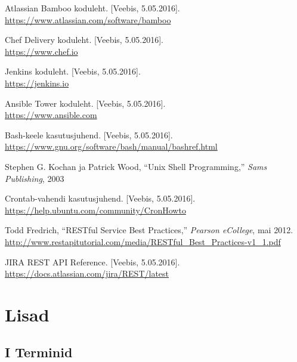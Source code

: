 \documentclass[12pt]{article}
\begin{document}
  \begin{thebibliography}{9}
    \label{kasutatud-materjalid}
    
    Atlassian Bamboo koduleht. [Veebis, 5.05.2016].\\
    \url{https://www.atlassian.com/software/bamboo}
    
    Chef Delivery koduleht. [Veebis, 5.05.2016].\\
    \url{https://www.chef.io}
  
    Jenkins koduleht. [Veebis, 5.05.2016].\\
    \url{https://jenkins.io}
  
    Ansible Tower koduleht. [Veebis, 5.05.2016].\\
    \url{https://www.ansible.com}
  
    Bash-keele kasutusjuhend. [Veebis, 5.05.2016].\\
    \url{https://www.gnu.org/software/bash/manual/bashref.html}
    
     Stephen G. Kochan ja Patrick Wood, ``Unix Shell Programming,'' \textit{Sams Publishing}, 2003
     
    Crontab-vahendi kasutusjuhend. [Veebis, 5.05.2016].\\
    \url{https://help.ubuntu.com/community/CronHowto}
    
    Todd Fredrich, ``RESTful Service Best Practices,'' \textit{Pearson eCollege}, mai 2012.\\
    \url{http://www.restapitutorial.com/media/RESTful_Best_Practices-v1_1.pdf}
    
    JIRA REST API Reference. [Veebis, 5.05.2016].\\
    \url{https://docs.atlassian.com/jira/REST/latest}
 
  \end{thebibliography}

  \newpage
  
  \section*{Lisad}
  \label{lisad}
  
  \subsection*{I Terminid}
  \label{terms}
  
\end{document}
